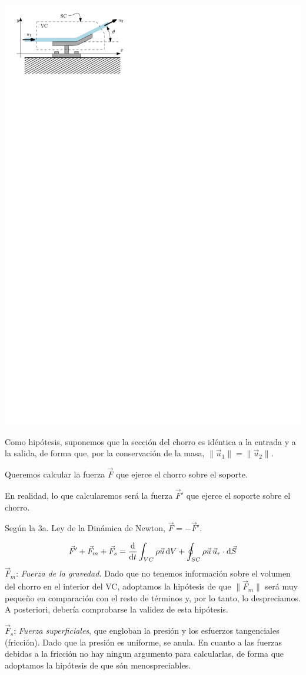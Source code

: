 \begin{center}
	\includegraphics[width=0.5\linewidth]{TeX_files/chapter04-Dinamica/ejemploCM}
\end{center}

		
		Como hipótesis, suponemos que la sección del chorro es idéntica a
		la entrada y a la salida, de forma que, por la conservación de la
		masa, $\|\vec{u}_{1}\|=\|\vec{u}_{2}\|$.
		
		Queremos calcular la fuerza $\vec{F}$ que ejerce el chorro sobre
		el soporte.
		
		En realidad, lo que calcularemos será la fuerza $\vec{F}'$ que ejerce
		el soporte sobre el chorro. 
		
		Según la 3a. Ley de la Dinámica de Newton, $\vec{F}=-\vec{F}'$.

	

		\[
		\vec{F}'+\vec{F}_{m}+\vec{F}_{s}=\frac{\textrm{d} \phantom{}}{\textrm{d} t}\int_{VC}\rho\vec{u}\,\text{d}V+\oint_{SC}\rho\vec{u}\,\vec{u}_{r}\cdot\text{d}\vec{S}
		\]
		$\vec{F}_{m}$: \emph{Fuerza de la gravedad.} Dado que no tenemos
		información sobre el volumen del chorro en el interior del VC, adoptamos
		la hipótesis de que $\|\vec{F}_{m}\|$ será muy pequeño en comparación
		con el resto de términos y, por lo tanto, lo despreciamos. A posteriori,
		debería comprobarse la validez de esta hipótesis.
		
		$\vec{F}_{s}$: \emph{Fuerza superficiales}, que engloban la presión
		y los esfuerzos tangenciales (fricción). Dado que la presión es uniforme,
		se anula. En cuanto a las fuerzas debidas a la fricción no hay ningun
		argumento para calcularlas, de forma que adoptamos la hipótesis de
		que són menospreciables.


